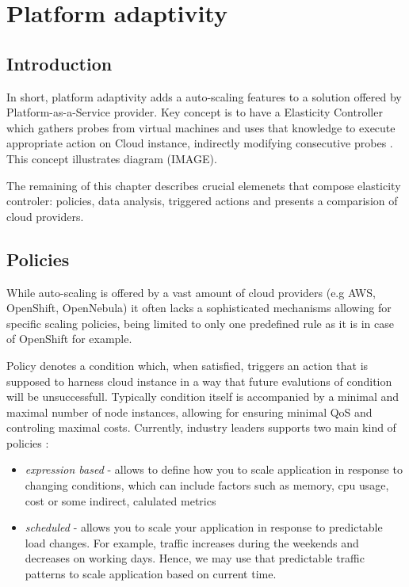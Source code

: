 \chapter{Platform adaptivity}


\section{Introduction}
In short, platform adaptivity adds a auto-scaling features to a solution offered by Platform-as-a-Service provider. Key concept is to have a Elasticity Controller which gathers probes from virtual machines and uses that knowledge to execute appropriate action on Cloud instance, indirectly modifying consecutive probes \cite{VaRoBu11}. This concept illustrates diagram (IMAGE).



The remaining of this chapter describes crucial elemenets that compose elasticity controler: policies, data analysis, triggered actions and presents a comparision of cloud providers.
 
\section{Policies}
While auto-scaling is offered by a vast amount of cloud providers (e.g AWS, OpenShift, OpenNebula) it often lacks a sophisticated mechanisms allowing for specific scaling policies, being limited to only one predefined rule as it is in case of OpenShift for example. 
 
Policy denotes a condition which, when satisfied, triggers an action that is supposed to harness cloud instance in a way that future evalutions of condition will be unsuccessfull. Typically condition itself is accompanied by a minimal and maximal number of node instances, allowing for ensuring minimal QoS and controling maximal costs. Currently, industry leaders supports two main kind of policies \cite{AmazonAutoScaling}:
\begin{itemize}
 \item \textit{expression based} - allows to define how you to scale application in response to changing conditions, which can include factors such as memory, cpu usage, cost or some indirect, calulated metrics
 \item \textit{scheduled} - allows you to scale your application in response to predictable load changes. For example, traffic increases during the weekends and decreases on working days. Hence, we may use that predictable traffic patterns to scale application based on current time.
\end{itemize}


